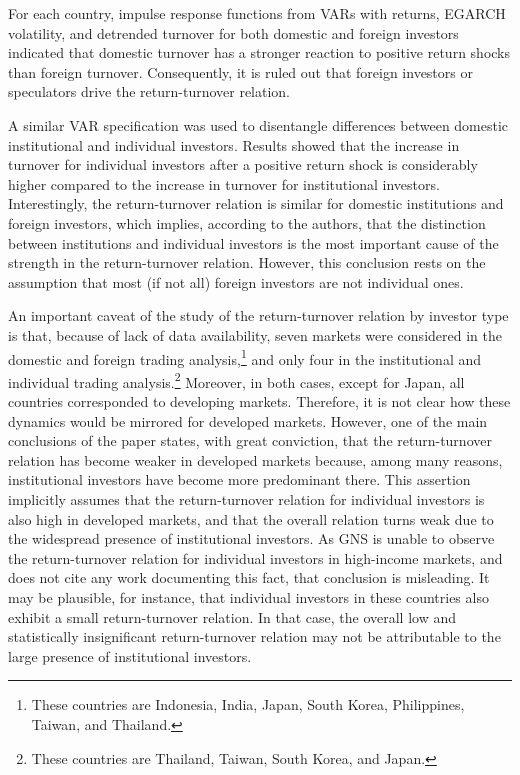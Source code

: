 \documentclass[final,3p,times,twocolumn]{elsarticle}
\begin{document}
For each country, impulse response functions from VARs with returns, EGARCH volatility, and detrended turnover for both domestic and foreign investors indicated that domestic turnover has a stronger reaction to positive return shocks than foreign turnover. Consequently, it is ruled out that foreign investors or speculators drive the return-turnover relation.\par 

A similar VAR specification was used to disentangle differences between domestic institutional and individual investors. Results showed that the increase in turnover for individual investors after a positive return shock is considerably higher compared to the increase in turnover for institutional investors. Interestingly, the return-turnover relation is similar for domestic institutions and foreign investors, which implies, according to the authors, that the distinction between institutions and individual investors is the most important cause of the strength in the return-turnover relation. However, this conclusion rests on the assumption that most (if not all) foreign investors are not individual ones.\par 

An important caveat of the study of the return-turnover relation by investor type is that, because of lack of data availability, seven markets were considered in the domestic and foreign trading analysis,\footnote{These countries are Indonesia, India, Japan, South Korea, Philippines, Taiwan, and Thailand.} and only four in the institutional and individual trading analysis.\footnote{These countries are Thailand, Taiwan, South Korea, and Japan.} Moreover, in both cases, except for Japan, all countries corresponded to developing markets. Therefore, it is not clear how these dynamics would be mirrored for developed markets. However, one of the main conclusions of the paper states, with great conviction, that the return-turnover relation has become weaker in developed markets because, among many reasons, institutional investors have become more predominant there. This assertion implicitly assumes that the return-turnover relation for individual investors is also high in developed markets, and that the overall relation turns weak due to the widespread presence of institutional investors. As GNS is unable to observe the return-turnover relation for individual investors in high-income markets, and does not cite any work documenting this fact, that conclusion is misleading. It may be plausible, for instance, that individual investors in these countries also exhibit a small return-turnover relation. In that case, the overall low and statistically insignificant return-turnover relation may not be attributable to the large presence of institutional investors.\par
\end{document}
